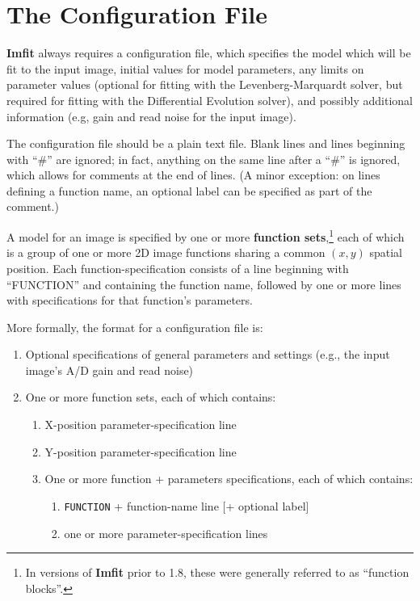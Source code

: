 \documentclass[10pt,a4paper,article]{memoir}
\newcommand{\Imfit}{\textbf{Imfit}}
\begin{document}
\newpage

\chapter{The Configuration File}\label{sec:configfile}

\Imfit{} always requires a configuration file, which specifies the model
which will be fit to the input image, initial values for model parameters, any
limits on parameter values (optional for fitting with the Levenberg-Marquardt
solver, but required for fitting with the Differential Evolution solver), and
possibly additional information (e.g, gain and read noise for the input image).

The configuration file should be a plain text file. Blank lines and
lines beginning with ``\#'' are ignored; in fact, anything on the same line after a
``\#'' is ignored, which allows for comments at the end of lines. (A minor exception:
on lines defining a function name, an optional label can be specified as part
of the comment.)

A model for an image is specified by one or more \textbf{function sets},\footnote{In
versions of \Imfit{} prior to 1.8, these were generally referred to as ``function 
blocks''.} each of
which is a group of one or more 2D image functions sharing a common $(x,y)$
spatial position. Each function-specification consists of a line beginning with
``FUNCTION'' and containing the function name, followed by one or more lines
with specifications for that function's parameters.

\bigskip

More formally, the format for a configuration file is:
\begin{enumerate}
\item Optional specifications of general parameters and settings (e.g., the
input image's A/D gain and read noise)
\item One or more function sets, each of which contains:
\begin{enumerate}
\item X-position parameter-specification line
\item Y-position parameter-specification line
\item One or more function + parameters specifications, each of which contains:
\begin{enumerate}
\item \texttt{FUNCTION} + function-name line [+ optional label]
\item one or more parameter-specification lines
\end{enumerate}
\end{enumerate}
\end{enumerate}
\end{document}
